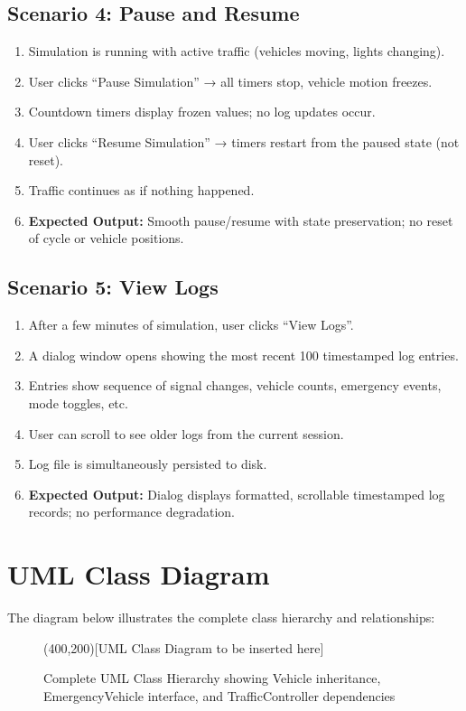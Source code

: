 \documentclass[12pt,a4paper]{article}
\begin{document}
\subsection{Scenario 4: Pause and Resume}
\begin{enumerate}
    \item Simulation is running with active traffic (vehicles moving, lights changing).
    \item User clicks ``Pause Simulation'' → all timers stop, vehicle motion freezes.
    \item Countdown timers display frozen values; no log updates occur.
    \item User clicks ``Resume Simulation'' → timers restart from the paused state (not reset).
    \item Traffic continues as if nothing happened.
    \item \textbf{Expected Output:} Smooth pause/resume with state preservation; no reset of cycle or vehicle positions.
\end{enumerate}

\subsection{Scenario 5: View Logs}
\begin{enumerate}
    \item After a few minutes of simulation, user clicks ``View Logs''.
    \item A dialog window opens showing the most recent 100 timestamped log entries.
    \item Entries show sequence of signal changes, vehicle counts, emergency events, mode toggles, etc.
    \item User can scroll to see older logs from the current session.
    \item Log file is simultaneously persisted to disk.
    \item \textbf{Expected Output:} Dialog displays formatted, scrollable timestamped log records; no performance degradation.
\end{enumerate}

\section{UML Class Diagram}
The diagram below illustrates the complete class hierarchy and relationships:

\begin{figure}[h]
    \centering
    \framebox(400,200){[UML Class Diagram to be inserted here]}
    \caption{Complete UML Class Hierarchy showing Vehicle inheritance, EmergencyVehicle interface, and TrafficController dependencies}
\end{figure}
\end{document}
